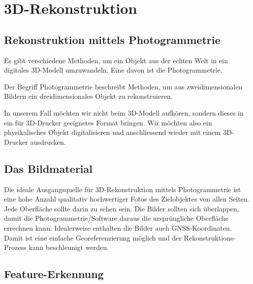 \chapter{3D-Rekonstruktion}

\section{Rekonstruktion mittels Photogrammetrie}

Es gibt verschiedene Methoden, um ein Objekt aus der echten Welt in ein
digitales 3D-Modell umzuwandeln. Eine davon ist die Photogrammetrie.

Der Begriff Photogrammetrie beschreibt Methoden, um aus zweidimensionalen
Bildern ein dreidimensionales Objekt zu rekonstruieren.

In unserem Fall möchten wir nicht beim 3D-Modell aufhören, sondern dieses in
ein für 3D-Drucker geeignetes Format bringen. Wir möchten also ein
physikalisches Objekt digitalisieren und anschliessend wieder mit einem
3D-Drucker ausdrucken.


\section{Das Bildmaterial}

Die ideale Ausgangsquelle für 3D-Rekonstruktion mittels Photogrammetrie ist
eine hohe Anzahl qualitativ hochwertiger Fotos des Zielobjektes von allen
Seiten. Jede Oberfläche sollte darin zu sehen sein.
%
%
Die Bilder sollten sich überlappen, damit die Photogrammetrie\-/Software daraus
die ursprüngliche Oberfläche errechnen kann. Idealerweise enthalten die Bilder
auch GNSS-Koordinaten. Damit ist eine einfache Georeferenzierung möglich und
der Rekonstruktions-Prozess kann beschleunigt werden.


\section{Feature-Erkennung} \label{photogrammetry:features}

